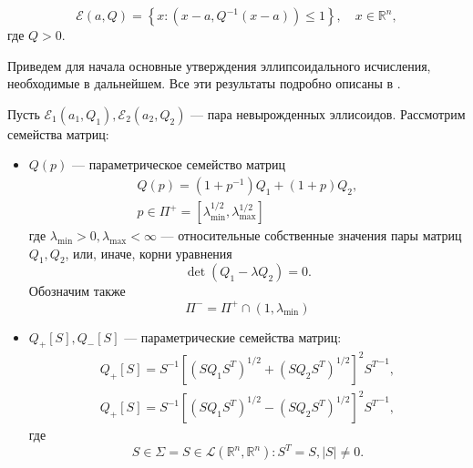 \begin{equation}
    \mathcal{E}(a, Q) = \left\{ x : (x - a, Q^{-1}(x - a)) \le 1 \right\}, \quad x \in \mathbb{R}^n,
\end{equation}
где \( Q > 0 \).

Приведем для начала основные утверждения эллипсоидального исчисления, необходимые в дальнейшем. Все
 эти результаты подробно описаны в \cite{ellips_calculus}.

\begin{theorem}
    Пусть \( \mathcal{E}_1(a_1, Q_1), \mathcal{E}_2(a_2, Q_2) \) --- пара невырожденных эллисоидов.
     Рассмотрим семейства матриц:
    \begin{itemize}
        \item \( Q(p) \) --- параметрическое семейство матриц
        \begin{equation*}
            \begin{gathered}
                Q(p) = (1 + p^{-1})Q_1 + (1 + p) Q_2,\\
                p \in \Pi^+ = \left[ \lambda_{\mathrm{min}}^{1/2}, \lambda_{\mathrm{max}}^{1/2} 
                 \right]
            \end{gathered}
        \end{equation*}
        где \( \lambda_{\mathrm{min}} > 0, \lambda_{\mathrm{max}} < \infty \) --- относительные
         собственные
        значения пары матриц \( Q_1, Q_2 \), или, иначе, корни уравнения
        \begin{equation*}
            \det (Q_1 - \lambda Q_2) = 0.
        \end{equation*}
        Обозначим также
        \begin{equation*}
            \Pi^- = \Pi^+ \cap(1, \lambda_{\mathrm{min}})
        \end{equation*}
        \item \( Q_+[S], Q_-[S] \) --- параметрические семейства матриц:
        \begin{equation*}
            \begin{gathered}
                Q_+[S] = S^{-1}[(S Q_1 S^T)^{1/2} + (S Q_2 S^T)^{1/2}]^2 {S^T}^{-1}, \\
                Q_+[S] = S^{-1}[(S Q_1 S^T)^{1/2} - (S Q_2 S^T)^{1/2}]^2 {S^T}^{-1},
            \end{gathered}
        \end{equation*}
        где
        \begin{equation*}
            S \in \Sigma = {S \in \mathcal{L}(\mathbb{R}^n, \mathbb{R}^n): S^T = S, |S| \ne 0}.

\end{equation*}
\end{itemize}
\end{theorem}
